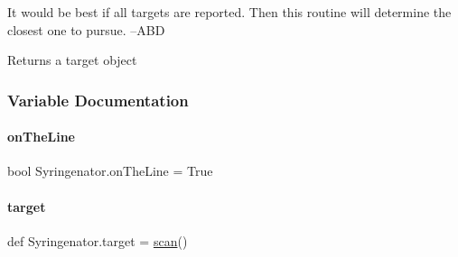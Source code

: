 It would be best if all targets are reported. Then this routine will determine the closest one to pursue. --A\+BD

\begin{DoxyReturn}{Returns}
a target object 
\end{DoxyReturn}


\subsubsection{Variable Documentation}
\mbox{\label{namespaceSyringenator_a161fa877b77c9ebb120c1ed20739260b}} 
\paragraph{\texorpdfstring{onTheLine}{onTheLine}}
{\footnotesize\ttfamily bool Syringenator.\+on\+The\+Line = True}

\mbox{\label{namespaceSyringenator_a66c7999289f77a4adce05169661f9660}} 
\paragraph{\texorpdfstring{target}{target}}
{\footnotesize\ttfamily def Syringenator.\+target = \mbox{\hyperlink{namespaceSyringenator_aff01237d3ff3e33f0ffc32927d813df0}{scan}}()}

